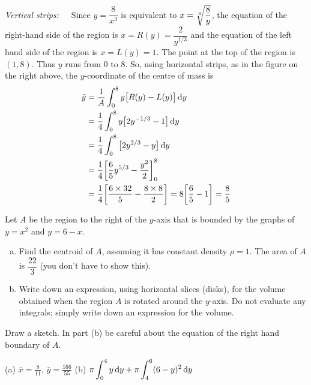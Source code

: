 \begin{solution}
\noindent \emph{Vertical strips:}\ \ \
Since $y=\dfrac{8}{x^3}$ is equivalent to $x=\root{3}\of{\dfrac{8}{y}}$,
the equation of the right-hand side of the region is $x=R(y)=\dfrac{2}{y^{1/3}}$
and the equation of the left hand side of the region is $x=L(y)=1$. The  point at the top of the region is $(1,8)$.
Thus $y$ runs from $0$ to $8$.
So, using horizontal strips, as in the figure on the right above,
the $y$-coordinate of the centre of mass is
\begin{align*}
\bar y & = \frac{1}{A}\int_0^8 y \big[R(y)-L(y)\big]\,\mathrm{d}y \\
&= \frac{1}{4}\int_0^8  y\big[ 2y^{-1/3} -1 \big] \,\mathrm{d}y  \\
&=\frac{1}{4}\int_0^8 \big[2y^{2/3}-y\big]\,\mathrm{d}y  \\
&= \frac{1}{4} \bigg[ \frac{6}{5}y^{5/3}-\frac{y^2}{2}\bigg]_0^8  \\
&=  \frac{1}{4}\bigg[ \frac{6\times 32}{5} - \frac{8\times 8}{2} \bigg]
   =  8\bigg[ \frac{6}{5} - 1 \bigg]
= \frac{8}{5}
\end{align*}



\end{solution}

\begin{question}[2016A]
Let $A$ be the region to the right of the $y$-axis that is bounded
by the graphs of $y=x^2$ and $y = 6-x$.
\begin{enumerate}[(a)]
\item Find the centroid of $A$, assuming it has constant density $\rho=1$.
The area of $A$ is $\dfrac{22}{3}$ (you don't have to show this).

\item Write down an expression, using horizontal slices (disks), for
the volume obtained when the region $A$ is rotated around the $y$-axis.
Do not evaluate any integrals; simply write down an expression for
the volume.
\end{enumerate}
\end{question}

\begin{hint}
Draw a sketch. In part (b) be careful about the equation of the right hand boundary of $A$.
\end{hint}

\begin{answer}
(a) $\displaystyle \bar x = \frac{8}{11}$, $\displaystyle\bar y = \frac{166}{55}$
\qquad (b) $\displaystyle\pi \int_0^4 y\,\mathrm{d}y + \pi \int_4^6 (6-y)^2\,\mathrm{d}y$
\end{answer}

